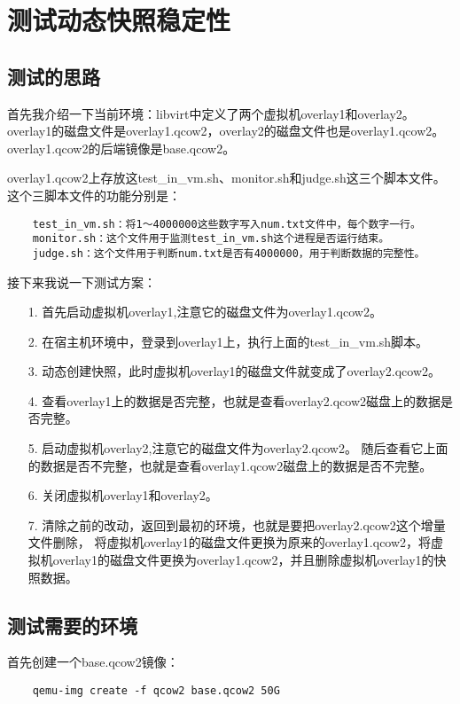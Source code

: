 \documentclass[a4paper,left=1.5cm,right=1.5cm,11pt]{article}
\begin{document}

\clearpage

\section{测试动态快照稳定性}
\subsection{测试的思路}
	首先我介绍一下当前环境：libvirt中定义了两个虚拟机overlay1和overlay2。
	overlay1的磁盘文件是overlay1.qcow2，overlay2的磁盘文件也是overlay1.qcow2。
	overlay1.qcow2的后端镜像是base.qcow2。\par

	overlay1.qcow2上存放这test\_in\_vm.sh、monitor.sh和judge.sh这三个脚本文件。
	这个三脚本文件的功能分别是：
	\begin{lstlisting}
	test_in_vm.sh：将1～4000000这些数字写入num.txt文件中，每个数字一行。
	monitor.sh：这个文件用于监测test_in_vm.sh这个进程是否运行结束。
	judge.sh：这个文件用于判断num.txt是否有4000000，用于判断数据的完整性。
	\end{lstlisting}

	接下来我说一下测试方案：
	\begin{itemize}
		\item[1.] 首先启动虚拟机overlay1,注意它的磁盘文件为overlay1.qcow2。
		\item[2.] 在宿主机环境中，登录到overlay1上，执行上面的test\_in\_vm.sh脚本。
		\item[3.] 动态创建快照，此时虚拟机overlay1的磁盘文件就变成了overlay2.qcow2。
		\item[4.] 查看overlay1上的数据是否完整，也就是查看overlay2.qcow2磁盘上的数据是否完整。
		\item[5.] 启动虚拟机overlay2,注意它的磁盘文件为overlay2.qcow2。
				  随后查看它上面的数据是否不完整，也就是查看overlay1.qcow2磁盘上的数据是否不完整。
		\item[6.] 关闭虚拟机overlay1和overlay2。
		\item[7.] 清除之前的改动，返回到最初的环境，也就是要把overlay2.qcow2这个增量文件删除，
		          将虚拟机overlay1的磁盘文件更换为原来的overlay1.qcow2，将虚拟机overlay1的磁盘文件更换为overlay1.qcow2，并且删除虚拟机overlay1的快照数据。
	\end{itemize}

\subsection{测试需要的环境}
	首先创建一个base.qcow2镜像：
	\begin{lstlisting}
	qemu-img create -f qcow2 base.qcow2 50G
	\end{lstlisting}
\end{document}
